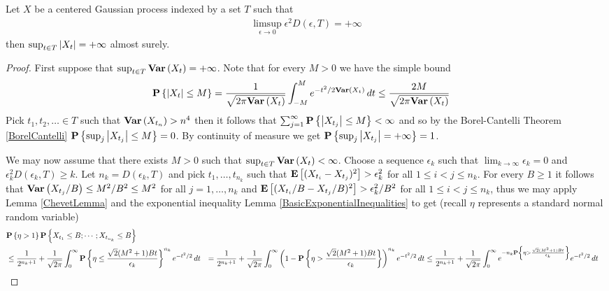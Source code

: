 \begin{thm}\label{SudakovChevet}Let $X$ be a centered Gaussian process indexed by a set $T$ such that 
\begin{align*}
\limsup_{\epsilon \to 0} \epsilon^2 D(\epsilon, T) = +\infty
\end{align*}
then $\sup_{t \in T} \left \vert X_t \right \vert = +\infty$ almost surely.
\end{thm}
\begin{proof}
First suppose that $\sup_{t \in T} \textbf{Var} \left (X_t \right ) = +\infty$.  Note that for every $M > 0$ we have the simple bound 
\begin{align*}
\textbf{P}\left \{\left \vert X_t \right \vert \leq M \right \} &= \frac{1}{\sqrt{2\pi \textbf{Var} \left (X_t \right )}} \int_{-M}^M e^{-t^2/2 \textbf{Var} \left (X_t \right )} \, dt \leq \frac{2M}{\sqrt{2\pi \textbf{Var} \left (X_t \right )}}
\end{align*} 
Pick $t_1, t_2, \dotsc \in T$ such that $\textbf{Var} \left (X_{t_n} \right ) > n^4$ then it follows that $\sum_{j=1}^\infty \textbf{P}\left \{\left \vert X_{t_j} \right \vert \leq M \right \} < \infty$ and so by the Borel-Cantelli Theorem \ref{BorelCantelli} $\textbf{P}\left \{\sup_j \left \vert X_{t_j} \right \vert \leq M \right \} = 0$.  By continuity of measure we get $\textbf{P}\left \{\sup_j \left \vert X_{t_j} \right \vert = +\infty \right \} = 1$.

We may now assume that  there exists $M > 0$ such that $\sup_{t \in T} \textbf{Var} \left (X_t \right ) < \infty$.  Choose a sequence $\epsilon_k$ such that $\lim_{k \to \infty} \epsilon_k = 0$ and $\epsilon_k^2 D(\epsilon_k, T) \geq k$.  Let $n_k = D(\epsilon_k, T)$ and pick $t_1, \dotsc, t_{n_k}$ such that $\textbf{E}\left[(X_{t_i} -X_{t_j})^2\right] > \epsilon_k^2$ for all $1 \leq i < j \leq n_k$.  For every $B \geq 1$ it follows that $\textbf{Var} \left (X_{t_j}/B \right ) \leq M^2/B^2 \leq M^2$ for all $j=1, \dotsc, n_k$ and $\textbf{E}\left[(X_{t_i}/B -X_{t_j}/B)^2\right] > \epsilon_k^2/B^2$ for all $1 \leq i < j \leq n_k$, thus we may apply Lemma \ref{ChevetLemma} and the exponential inequality Lemma \ref{BasicExponentialInequalities} to get (recall $\eta$ represents a standard normal random variable)
\begin{align*}
&\textbf{P}\left \{\eta > 1 \right \} \textbf{P}\left \{X_{t_1} \leq B; \dotsb ; X_{t_{n_k}} \leq B \right \} \\
&\leq \frac{1}{2^{n_k+1}} + \frac{1}{\sqrt{2\pi}} \int_0^\infty \textbf{P}\left \{\eta \leq \frac{\sqrt{2}(M^2+1)Bt}{\epsilon_k} \right \}^{n_k} e^{-t^2/2} \, dt
&= \frac{1}{2^{n_k+1}} + \frac{1}{\sqrt{2\pi}} \int_0^\infty \left(1 - \textbf{P}\left \{\eta > \frac{\sqrt{2}(M^2+1)Bt}{\epsilon_k} \right \} \right)^{n_k} e^{-t^2/2} \, dt
&\leq \frac{1}{2^{n_k+1}} + \frac{1}{\sqrt{2\pi}} \int_0^\infty e^{-n_k \textbf{P}\left \{\eta > \frac{\sqrt{2}(M^2+1)Bt}{\epsilon_k} \right \}}  e^{-t^2/2} \, dt
\end{align*}


\end{proof}
